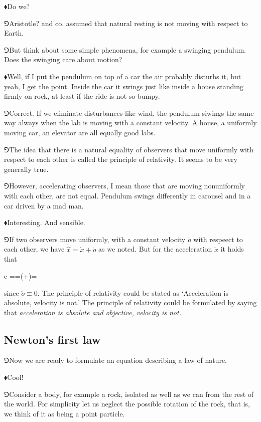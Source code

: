 \documentclass[10pt,oneside%
]{memoir}
\newenvironment{eqna}{\begin{IEEEeqnarray*}{c}}{\end{IEEEeqnarray*}\ignorespacesafterend}
\newcommand{\der}[2]{\frac{\dd#1}{\dd#2}}
\newcommand{\dd}{\mathrm{d}}
\newcommand{\primed}[1]{\hat{#1}}
\newcommand{\hea}{\(\blacklozenge\)\;}
\newcommand{\heb}{\(\Game\)\;}
\begin{document}
\hea Do we?

\heb Aristotle? and co. assumed that natural resting is not moving with respect to Earth.

\heb But think about some simple phenomena, for example a swinging pendulum. Does the swinging care about motion?

\hea Well, if I put the pendulum on top of a car the air probably disturbs it, but yeah, I get the point. Inside the car it swings just like inside a house standing firmly on rock, at least if the ride is not so bumpy.

\heb Correct. If we eliminate disturbances like wind, the pendulum siwings the same way always when the lab is moving with a constant velocity. A house, a uniformly moving car, an elevator are all equally good labs.

\heb The idea that there is a natural equality of observers that move uniformly with respect to each other is called the principle of relativity. It seems to be very generally true.

\heb However, accelerating observers, I mean those that are moving nonuniformly with each other, are not equal. Pendulum swings differently in carousel and in a car driven by a mad man.

\hea Interesting. And sensible.

\heb If two observers move uniformly, with a constant velocity \(\dot{o}\) with respeect to each other, we have \(\dot{\primed{x}}=\dot{x}+\dot{o}\) as we noted. But for the acceleration \(\ddot{x}\) it holds that
\begin{eqna}
    \ddot{\primed{x}}=\der{}{t}\dot{\primed{x}}=\der{}{t}(+)=
\end{eqna}
since \(\ddot{o}\equiv 0\). The principle of relativity could be stated as `Acceleration is absolute, velocity is not.' The principle of relativity could be formulated by saying that \emph{acceleration is absolute and objective, velocity is not.}
\subsection{Newton's first law}
\heb Now we are ready to formulate an equation describing a law of nature.

\hea Cool!

\heb Consider a body, for example a rock, isolated as well as we can from the rest of the world. For simplicity let us neglect the possible rotation of the rock, that is, we think of it as being a point particle.
\end{document}
